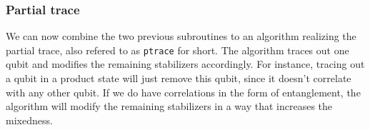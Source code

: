 


\subsubsection{Partial trace}
We can now combine the two previous subroutines to an algorithm realizing the
partial trace, also refered to as \verb|ptrace| for short. The algorithm traces
out one qubit and modifies the remaining stabilizers accordingly. For instance,
tracing out a qubit in a product state will just remove this qubit, since it
doesn't correlate with any other qubit. If we do have correlations in the form
of entanglement, the algorithm will modify the remaining stabilizers in a way
that increases the mixedness. 

